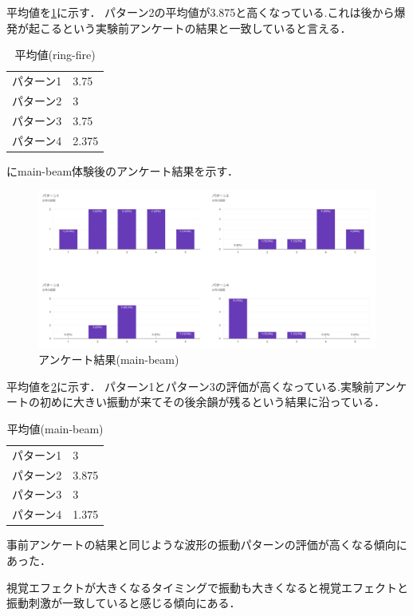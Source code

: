 平均値を\ref{tab;ringAve}に示す．
パターン2の平均値が3.875と高くなっている.これは後から爆発が起こるという実験前アンケートの結果と一致していると言える．

\begin{table}[H]
    \caption{平均値(ring-fire)}
    \centering
    \begin{tabular}{l|l}
    \hline
    \hline
    パターン1 & 3.75\\
    パターン2 & 3\\
    パターン3 & 3.75\\
    パターン4 & 2.375\\
    \hline
    \end{tabular}
    \label{tab;ringAve}
\end{table}

にmain-beam体験後のアンケート結果を示す．

\begin{figure}[h]
  \centering
  \includegraphics[clip,width=14cm]{fig/mainbeamAnk.png}
  \caption{アンケート結果(main-beam)}\label{mainAnk}
  \end{figure}


平均値を\ref{tab;mainAve}に示す．
パターン1とパターン3の評価が高くなっている.実験前アンケートの初めに大きい振動が来てその後余韻が残るという結果に沿っている．

  \begin{table}[H]
    \caption{平均値(main-beam)}
    \centering
    \begin{tabular}{l|l}
    \hline
    \hline
    パターン1 & 3\\
    パターン2 & 3.875\\
    パターン3 & 3\\
    パターン4 & 1.375\\
    \hline
    \end{tabular}
    \label{tab;mainAve}
\end{table}

事前アンケートの結果と同じような波形の振動パターンの評価が高くなる傾向にあった．

視覚エフェクトが大きくなるタイミングで振動も大きくなると視覚エフェクトと振動刺激が一致していると感じる傾向にある．


